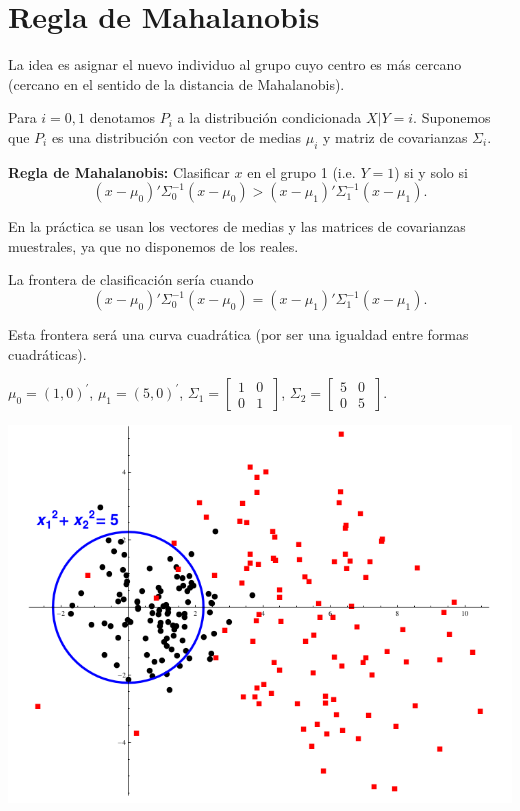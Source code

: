 \section{Regla de Mahalanobis}

La idea es asignar el nuevo individuo al grupo cuyo centro es más cercano (cercano en el sentido de la distancia de Mahalanobis).


\begin{defn}
Para $i=0,1$ denotamos $P_i$  a la distribución condicionada  $X|Y=i$. Suponemos que $P_i$ es una distribución con vector de medias $\mu_i$ y matriz de covarianzas $\Sigma_i$.


\textbf{Regla de Mahalanobis:} Clasificar $x$ en el grupo 1 (i.e. $Y=1$) si y solo si
\[
(x-\mu_0)'\Sigma_0^{-1}(x-\mu_0) >  (x-\mu_1)'\Sigma_1^{-1}(x-\mu_1).
\]
\end{defn}
En la práctica se usan los vectores de medias y las matrices de covarianzas muestrales, ya que no disponemos de los reales.

La frontera de clasificación sería cuando 
\[
(x-\mu_0)'\Sigma_0^{-1}(x-\mu_0) =  (x-\mu_1)'\Sigma_1^{-1}(x-\mu_1).
\]

Esta frontera será una curva cuadrática (por ser una igualdad entre formas cuadráticas). 

\begin{example}


\centerline{$\mu_0=(1,0)^\prime$, $\mu_1=
(5,0)^\prime$, $\Sigma_1=\left[
  \begin{array}{cc}
    1 & 0 \\
    0 & 1 \
  \end{array} \right]$,
$\Sigma_2=\left[
  \begin{array}{cc}
    5 & 0 \\
    0 & 5 \
  \end{array} \right]$.}

\begin{center}
\includegraphics[width=13 cm]{img/ReglaMahalanobis.png}
\end{center}

\end{example}

